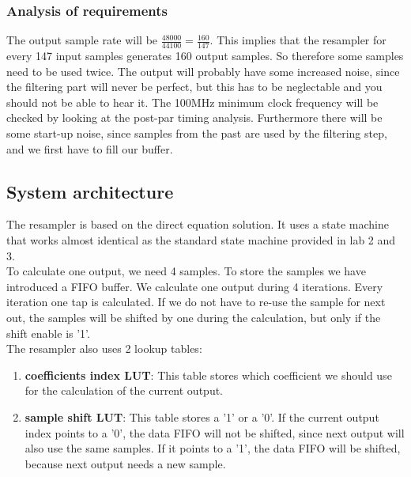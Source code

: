 \documentclass[a4paper,twoside,11pt, fleqn]{article}
\begin{document}
\subsubsection{Analysis of requirements}
The output sample rate will be $\frac{48000}{44100} = \frac{160}{147}$. This implies that the resampler for every 147 input samples generates 160 output samples. So therefore some samples need to be used twice. The output will probably have some increased noise, since the filtering part will never be perfect, but this has to be neglectable and you should not be able to hear it. The 100MHz minimum clock frequency will be checked by looking at the post-par timing analysis. Furthermore there will be some start-up noise, since samples from the past are used by the filtering step, and we first have to fill our buffer.

\newpage
\subsection{System architecture}
The resampler is based on the direct equation solution. It uses a state machine that works almost identical as the standard state machine provided in lab 2 and 3. \\

To calculate one output, we need 4 samples. To store the samples we have introduced a FIFO buffer. We calculate one output during 4 iterations.  Every iteration one tap is calculated. If we do not have to re-use the sample for next out, the samples will be shifted by one during the calculation, but only if the shift enable is '1'.\\

The resampler also uses 2 lookup tables:
\begin{enumerate}
\item \textbf{coefficients index LUT}: This table stores which coefficient we should use for the calculation of the current output.
\item \textbf{sample shift LUT}: This table stores a '1' or a '0'. If the current output index points to a '0', the data FIFO will not be shifted, since next output will also use the same samples. If it points to a '1', the data FIFO  will be shifted, because next output needs a new sample.
\end{enumerate}
\end{document}
